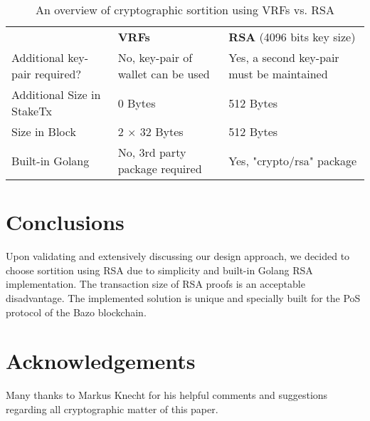 \documentclass[12pt,a4]{article}
\begin{document}
\begin{table}
  \centering
  \begin{tabularx}{\textwidth}{p{2.8cm}XX}
    \rowcolor{white}
    & \textbf{VRFs} & \textbf{RSA} (4096 bits key size) \\
    Additional key-pair required? & No, key-pair of wallet can be used & Yes, a second key-pair must be maintained \\
    Additional Size in StakeTx & 0 Bytes & 512 Bytes \\
    Size in Block & 2 $\times$ 32 Bytes & 512 Bytes \\
    Built-in Golang & No, 3rd party package required & Yes, "crypto/rsa" package
  \end{tabularx}
  \caption{An overview of cryptographic sortition using VRFs vs. RSA}
\end{table}

\section{Conclusions}
Upon validating and extensively discussing our design approach, we decided to choose sortition using RSA due to simplicity and built-in Golang RSA implementation. The transaction size of RSA proofs is an acceptable disadvantage. The implemented solution is unique and specially built for the PoS protocol of the Bazo blockchain.

\section*{Acknowledgements}

Many thanks to Markus Knecht for his helpful comments and suggestions regarding all cryptographic matter of this paper. 
\end{document}

